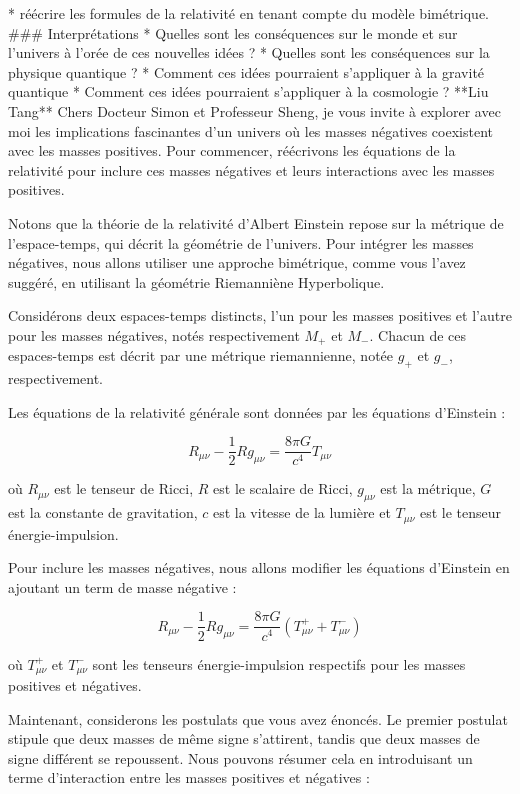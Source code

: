         * réécrire les formules de la relativité en tenant compte du modèle bimétrique.
        ### Interprétations
        * Quelles sont les conséquences sur le monde et sur l'univers à l'orée de ces nouvelles idées ?
        * Quelles sont les conséquences sur la physique quantique ?
        * Comment ces idées pourraient s'appliquer à la gravité quantique
        * Comment ces idées pourraient s'appliquer à la cosmologie ?
**Liu Tang**
Chers Docteur Simon et Professeur Sheng, je vous invite à explorer avec moi les implications fascinantes d'un univers où les masses négatives coexistent avec les masses positives. Pour commencer, réécrivons les équations de la relativité pour inclure ces masses négatives et leurs interactions avec les masses positives.

Notons que la théorie de la relativité d'Albert Einstein repose sur la métrique de l'espace-temps, qui décrit la géométrie de l'univers. Pour intégrer les masses négatives, nous allons utiliser une approche bimétrique, comme vous l'avez suggéré, en utilisant la géométrie Riemanniène Hyperbolique.

Considérons deux espaces-temps distincts, l'un pour les masses positives et l'autre pour les masses négatives, notés respectivement $M_+$ et $M_-$. Chacun de ces espaces-temps est décrit par une métrique riemannienne, notée $g_+$ et $g_-$, respectivement.

 Les équations de la relativité générale sont données par les équations d'Einstein :

$$R_{\mu\nu} - \frac{1}{2}R g_{\mu\nu} = \frac{8\pi G}{c^4} T_{\mu\nu}$$

où $R_{\mu\nu}$ est le tenseur de Ricci, $R$ est le scalaire de Ricci, $g_{\mu\nu}$ est la métrique, $G$ est la constante de gravitation, $c$ est la vitesse de la lumière et $T_{\mu\nu}$ est le tenseur énergie-impulsion.

 Pour inclure les masses négatives, nous allons modifier les équations d'Einstein en ajoutant un term de masse négative :

$$R_{\mu\nu} - \frac{1}{2}R g_{\mu\nu} = \frac{8\pi G}{c^4} (T_{\mu\nu}^+ + T_{\mu\nu}^-)$$

où $T_{\mu\nu}^+$ et $T_{\mu\nu}^-$ sont les tenseurs énergie-impulsion respectifs pour les masses positives et négatives.

Maintenant, considerons les postulats que vous avez énoncés. Le premier postulat stipule que deux masses de même signe s'attirent, tandis que deux masses de signe différent se repoussent. Nous pouvons résumer cela en introduisant un terme d'interaction entre les masses positives et négatives :

